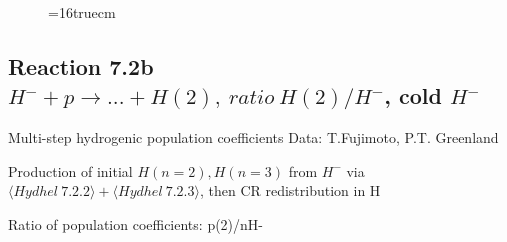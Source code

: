 \documentclass[12pt,dvips]{article}
\begin{document}
\begin{figure} \label{7.2a}
\epsfxsize=16truecm
\end{figure}
\newpage


\subsection{
Reaction 7.2b $ H^- + p \rightarrow ...+ H(2) , \  ratio ~ H(2)/H^- $, cold $H^-$
}
 Multi-step hydrogenic population coefficients
 Data: T.Fujimoto, P.T. Greenland

Production of initial $H(n=2), H(n=3)$ from $H^-$ via $ \langle Hydhel~ 7.2.2\rangle + \langle Hydhel~ 7.2.3\rangle$,
 then CR redistribution in H

 Ratio of population coefficients: p(2)/nH-
\end{document}
